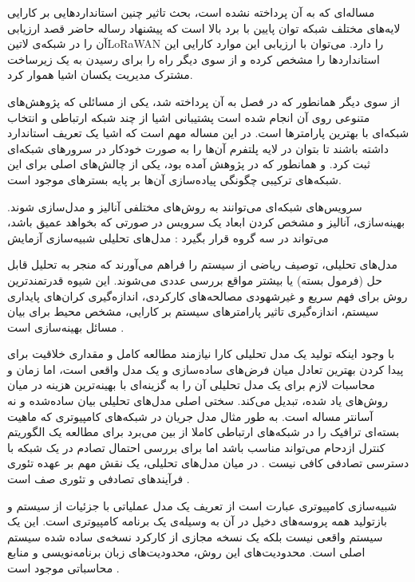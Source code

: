 مساله‌ای که به آن پرداخته نشده است، بحث تاثیر چنین استاندارد‌هایی بر کارایی لایه‌های مختلف شبکه توان پایین با برد بالا است که پیشنهاد رساله حاضر قصد ارزیابی آن را
در شبکه‌ی ‌لاتین{LoRaWAN} را دارد.
می‌توان با ارزیابی این موارد کارایی این استانداردها را مشخص کرده و از سوی دیگر راه را برای رسیدن به یک زیرساخت مشترک مدیریت یکسان اشیا هموار کرد.

از سوی دیگر همانطور که در فصل  به آن پرداخته شد،
یکی از مسائلی که پژوهش‌های متنوعی روی آن انجام شده است پشتیبانی اشیا از چند شبکه ارتباطی و انتخاب شبکه‌ای با بهترین
پارامترها است. در این مساله مهم است که اشیا یک تعریف استاندارد داشته باشند تا بتوان در لایه پلتفرم آن‌ها را به صورت خودکار در سرورهای شبکه‌ای ثبت کرد.
و همانطور که در پژوهش  آمده بود، یکی از چالش‌های اصلی برای این شبکه‌های ترکیبی چگونگی پیاده‌سازی آن‌ها بر پایه بسترهای موجود است.


سرویس‌های شبکه‌ای می‌توانند به روش‌های مختلفی آنالیز و مدل‌سازی شوند.
بهینه‌سازی، آنالیز و مشخص کردن ابعاد یک سرویس در صورتی که بخواهد عمیق باشد، می‌تواند در سه گروه قرار بگیرد
:
 مدل‌های تحلیلی
 شبیه‌سازی
 آزمایش

مدل‌های تحلیلی، توصیف ریاضی از سیستم را فراهم می‌آورند که منجر به تحلیل قابل حل (فرمول بسته) یا بیشتر مواقع بررسی عددی می‌شوند.
این شیوه قدرتمند‌ترین روش برای فهم سریع و غیرشهودی مصالحه‌های کارکردی، اندازه‌گیری کران‌های پایداری سیستم،
اندازه‌گیری تاثیر پارامترهای سیستم بر کارایی، مشخص محیط برای بیان مسائل بهینه‌سازی است
.

با وجود اینکه تولید یک مدل تحلیلی کارا نیازمند مطالعه کامل و مقداری خلاقیت برای پیدا کردن بهترین تعادل میان
فرض‌های ساده‌سازی و یک مدل واقعی است، اما زمان و محاسبات لازم برای یک مدل تحلیلی آن را به گزینه‌ای با بهینه‌ترین
هزینه در میان روش‌های یاد شده، تبدیل می‌کند.
سختی اصلی مدل‌های تحلیلی بیان ساده‌شده و نه آسانتر مساله است. به طور مثال مدل جریان در شبکه‌های کامپیوتری
که ماهیت بسته‌ای ترافیک را در شبکه‌های ارتباطی کاملا از بین می‌برد برای مطالعه یک الگوریتم کنترل ازدحام می‌تواند
مناسب باشد اما برای بررسی احتمال تصادم در یک شبکه با دسترسی تصادفی کافی نیست
.
در میان مدل‌های تحلیلی، یک نقش مهم بر عهده تئوری فرآیندهای تصادفی و تئوری صف است
.

شبیه‌سازی کامپیوتری عبارت است از تعریف یک مدل عملیاتی با جزئیات از سیستم و بازتولید
همه پروسه‌های دخیل در آن به وسیله‌ی یک برنامه کامپیوتری است.
این یک سیستم واقعی نیست بلکه یک نسخه مجازی از کارکرد نسخه‌ی ساده شده سیستم اصلی است.
محدودیت‌های این روش، محدودیت‌های زبان برنامه‌نویسی و منابع محاسباتی موجود است
.

